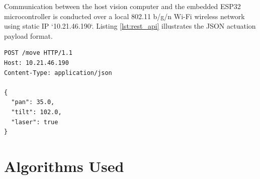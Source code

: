 Communication between the host vision computer and the embedded ESP32 microcontroller is conducted over a local 802.11 b/g/n Wi-Fi wireless network using static IP `10.21.46.190`. Listing \ref{lst:rest_api} illustrates the JSON actuation payload format.

\begin{lstlisting}[caption={ESP32 RESTful Actuation Command Payload}, label={lst:rest_api}]
POST /move HTTP/1.1
Host: 10.21.46.190
Content-Type: application/json

{
  "pan": 35.0,
  "tilt": 102.0,
  "laser": true
}
\end{lstlisting}

\section{Algorithms Used}

